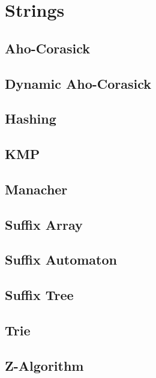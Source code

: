 \section{Strings}
\subsection{Aho-Corasick}
\raggedbottom
\hrulefill
\subsection{Dynamic Aho-Corasick}
\raggedbottom
\hrulefill
\subsection{Hashing}
\raggedbottom
\hrulefill
\subsection{KMP}
\raggedbottom
\hrulefill
\subsection{Manacher}
\raggedbottom
\hrulefill
\subsection{Suffix Array}
\raggedbottom
\hrulefill
\subsection{Suffix Automaton}
\raggedbottom
\hrulefill
\subsection{Suffix Tree}
\raggedbottom
\hrulefill
\subsection{Trie}
\raggedbottom
\hrulefill
\subsection{Z-Algorithm}
\raggedbottom
\hrulefill
\newpage

